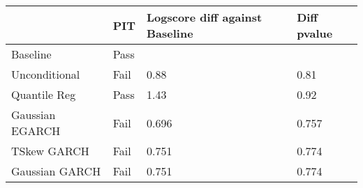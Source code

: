 \begin{tabular}{llll}
\toprule
{} &   PIT & Logscore diff against Baseline & Diff pvalue \\
\midrule
Baseline        &  Pass &                                &             \\
Unconditional   &  Fail &                           0.88 &        0.81 \\
Quantile Reg    &  Pass &                           1.43 &        0.92 \\
Gaussian EGARCH &  Fail &                          0.696 &       0.757 \\
TSkew GARCH     &  Fail &                          0.751 &       0.774 \\
Gaussian GARCH  &  Fail &                          0.751 &       0.774 \\
\bottomrule
\end{tabular}
